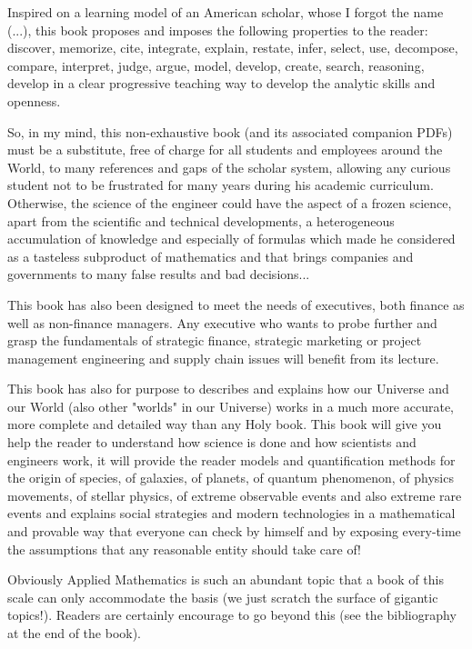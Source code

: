 	Inspired on a learning model of an American scholar, whose I forgot the name (...), this book proposes and imposes the following properties to the reader: discover, memorize, cite, integrate, explain, restate, infer, select, use, decompose, compare, interpret, judge, argue, model, develop, create, search, reasoning, develop in a clear progressive teaching way to develop the analytic skills and openness.

	So, in my mind, this non-exhaustive book (and its associated companion PDFs) must be a substitute, free of charge for all students and employees around the World, to many references and gaps of the scholar system, allowing any curious student not to be frustrated for many years during his academic curriculum. Otherwise, the science of the engineer could have the aspect of a frozen science, apart from the scientific and technical developments, a heterogeneous accumulation of knowledge and especially of formulas which made he considered as a tasteless subproduct of mathematics and that brings companies and governments to many false results and bad decisions...
	
	This book has also been designed to meet the needs of executives, both finance as well as non-finance managers. Any executive who wants to probe further and grasp the fundamentals of strategic finance, strategic marketing or project management engineering and supply chain issues will benefit from its lecture. 
	
	This book has also for purpose to describes and explains how our Universe and our World (also other "worlds" in our Universe) works in a much more accurate, more complete and detailed way than any Holy book. This book will give you help the reader to understand how science is done and how scientists and engineers work, it will provide the reader models and quantification methods for the origin of species, of galaxies, of planets, of quantum phenomenon, of physics movements, of stellar physics, of extreme observable events and also extreme rare events and explains social strategies and modern technologies in a mathematical and provable way that everyone can check by himself and by exposing every-time the assumptions that any reasonable entity should take care of!
	
	Obviously Applied Mathematics is such an abundant topic that a book of this scale can only accommodate the basis (we just scratch the surface of gigantic topics!). Readers are certainly encourage to go beyond this (see the bibliography at the end of the book).

